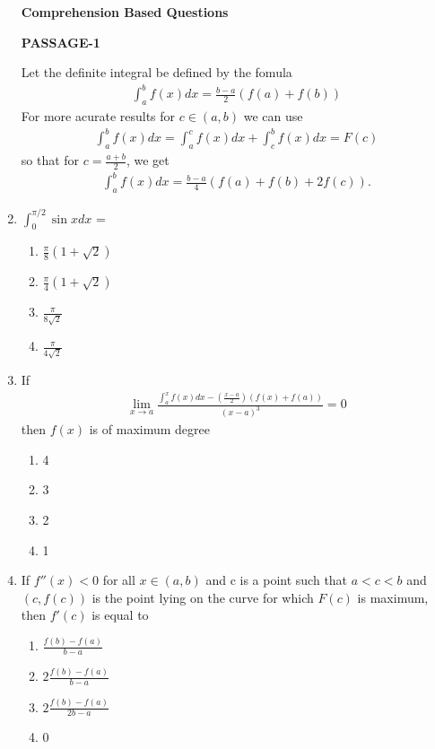 \begin{enumerate}[label=\arabic*.,ref=\thesubsection.\theenumi]
\clearpage

\textbf{Comprehension Based Questions}

\textbf{PASSAGE-1}

Let the definite integral be defined by the fomula 
\begin{align*}
\int_{a}^{b}f(x)dx = \frac{b - a}{2}(f(a) + f(b))
\end{align*}
For more acurate results for $c \in (a, b)$ we can use
\begin{align*}
\int_{a}^{b}f(x)dx = \int_{a}^{c}f(x)dx + \int_{c}^{b}f(x)dx = F(c)
\end{align*}
so that for $c = \frac{a + b}{2}$, we get 
\begin{align*}
\int_{a}^{b}f(x)dx = \frac{b - a}{4}(f(a) + f(b) + 2f(c)).
\end{align*}

\item $\int_{0}^{\pi/2}\sin x dx$ = 
\begin{enumerate}
\item $\frac{\pi}{8}(1 + \sqrt{2})$
\item $\frac{\pi}{4}(1 + \sqrt{2})$
\item $\frac{\pi}{8\sqrt{2}}$
\item $\frac{\pi}{4\sqrt{2}}$
\end{enumerate}

\item If
\begin{align*}
\lim_{x \to a}\frac{\int_{a}^{x}f(x)dx - \left(\frac{x - a}{2}\right)(f(x) + f(a))}{(x - a)^3} = 0
\end{align*}
then $f(x)$ is of maximum degree
\begin{enumerate}
\item 4
\item 3
\item 2
\item 1
\end{enumerate}

\item If $f''(x) < 0$ for all $x \in (a, b)$ and c is a point such that $a < c < b$ and $(c, f(c))$ is the point lying on the curve for which $F(c)$ is maximum, then $f'(c)$ is equal to
\begin{enumerate}
\item $\frac{f(b) - f(a)}{b - a}$
\item $2\frac{f(b) - f(a)}{b - a}$
\item $2\frac{f(b) - f(a)}{2b - a}$
\item 0
\end{enumerate}


\end{enumerate}
